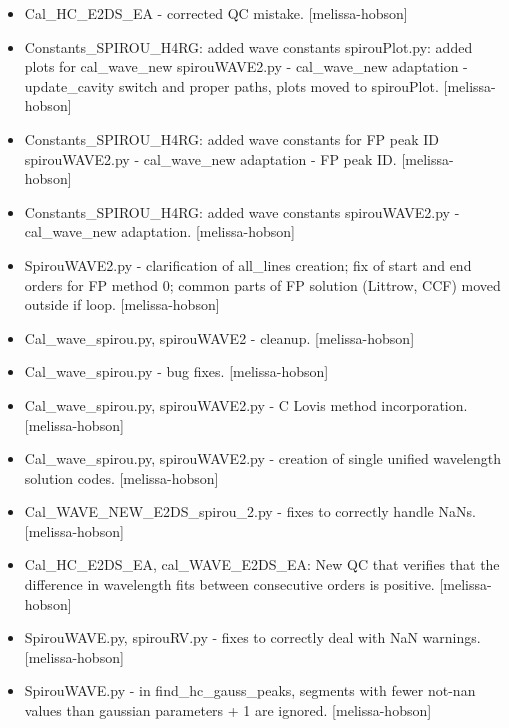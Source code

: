 \documentclass[a4paper,10pt,english]{report}
\begin{document}
\begin{itemize}
\item {} 
Cal\_HC\_E2DS\_EA - corrected QC mistake. {[}melissa-hobson{]}

\item {} 
Constants\_SPIROU\_H4RG: added wave constants spirouPlot.py: added plots
for cal\_wave\_new spirouWAVE2.py - cal\_wave\_new adaptation -
update\_cavity switch and proper paths, plots moved to spirouPlot.
{[}melissa-hobson{]}

\item {} 
Constants\_SPIROU\_H4RG: added wave constants for FP peak ID
spirouWAVE2.py - cal\_wave\_new adaptation - FP peak ID. {[}melissa-
hobson{]}

\item {} 
Constants\_SPIROU\_H4RG: added wave constants spirouWAVE2.py -
cal\_wave\_new adaptation. {[}melissa-hobson{]}

\item {} 
SpirouWAVE2.py - clarification of all\_lines creation; fix of start and
end orders for FP method 0; common parts of FP solution (Littrow, CCF)
moved outside if loop. {[}melissa-hobson{]}

\item {} 
Cal\_wave\_spirou.py, spirouWAVE2 - cleanup. {[}melissa-hobson{]}

\item {} 
Cal\_wave\_spirou.py - bug fixes. {[}melissa-hobson{]}

\item {} 
Cal\_wave\_spirou.py, spirouWAVE2.py - C Lovis method incorporation.
{[}melissa-hobson{]}

\item {} 
Cal\_wave\_spirou.py, spirouWAVE2.py - creation of single unified
wavelength solution codes. {[}melissa-hobson{]}

\item {} 
Cal\_WAVE\_NEW\_E2DS\_spirou\_2.py - fixes to correctly handle NaNs.
{[}melissa-hobson{]}

\item {} 
Cal\_HC\_E2DS\_EA, cal\_WAVE\_E2DS\_EA: New QC that verifies that the
difference in wavelength fits between consecutive orders is positive.
{[}melissa-hobson{]}

\item {} 
SpirouWAVE.py, spirouRV.py - fixes to correctly deal with NaN
warnings. {[}melissa-hobson{]}

\item {} 
SpirouWAVE.py - in find\_hc\_gauss\_peaks, segments with fewer not-nan
values than gaussian parameters + 1 are ignored. {[}melissa-hobson{]}


\end{itemize}
\end{document}
